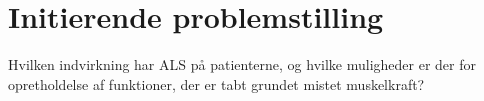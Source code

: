 \section{Initierende problemstilling}
Hvilken indvirkning har ALS på patienterne, og hvilke muligheder er der for opretholdelse af funktioner, der er tabt grundet mistet muskelkraft?